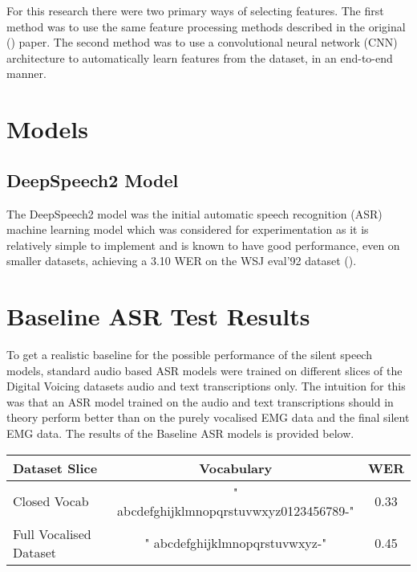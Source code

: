 For this research there were two primary ways of selecting features. The first method
was to use the same feature processing methods described in the original
(\cite{gaddy2020digital}) paper. The second method was to use a convolutional
neural network (CNN) architecture to automatically learn features from the
dataset, in an end-to-end manner.

\section{Models}

\subsection{DeepSpeech2 Model}

The DeepSpeech2 model was the initial automatic speech recognition (ASR) machine
learning model which was considered for experimentation as it is relatively simple to
implement and is known to have good performance, even on smaller datasets, achieving
a 3.10 WER on the WSJ eval'92 dataset
(\cite{DS2_original}).

\section{Baseline ASR Test Results}

To get a realistic baseline for the possible performance of the silent
speech models, standard audio based ASR models were trained on different
slices of the Digital Voicing datasets audio and text transcriptions only.
The intuition for this was that an ASR model trained on the audio and text
transcriptions should in theory perform better than on the purely vocalised
EMG data and the final silent EMG data. The results of the Baseline ASR models
is provided below.

\begin{center}
\begin{tabular} { | l | c | c | }
Dataset Slice & Vocabulary & WER \\
\hline
Closed Vocab & " abcdefghijklmnopqrstuvwxyz0123456789-" & 0.33 \\
Full Vocalised Dataset & " abcdefghijklmnopqrstuvwxyz-" & 0.45
\end{tabular}
\end{center}